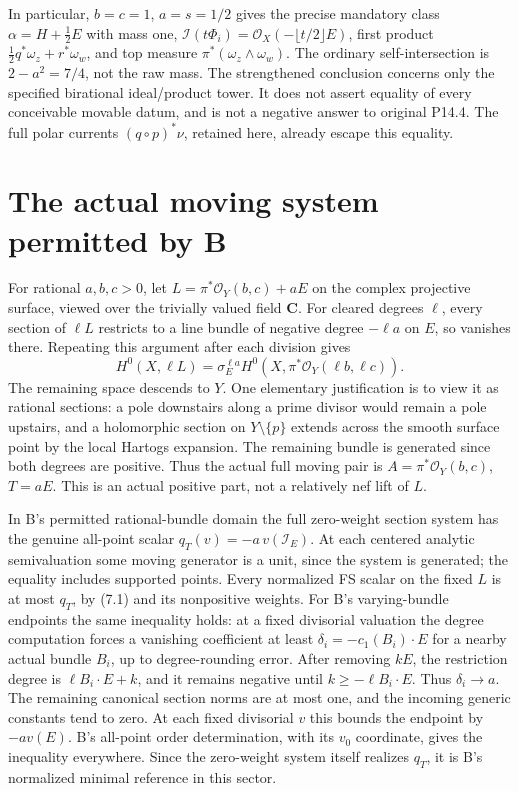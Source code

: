\documentclass[11pt]{article}
\theoremstyle{remark}\newtheorem{remark}[theorem]{Remark}
\newcommand{\cI}{\mathcal I}
\begin{document}
In particular, $b=c=1$, $a=s=1/2$ gives the precise mandatory
class $\alpha=H+\frac12E$ with mass one,
$\cI(t\Phi_i)=\mathcal O_X(-\lfloor t/2\rfloor E)$,
first product $\frac12q^*\omega_z+r^*\omega_w$, and top measure
$\pi^*(\omega_z\wedge\omega_w)$.
The ordinary self-intersection is $2-a^2=7/4$, not the raw mass.
The strengthened conclusion concerns only the specified birational
ideal/product tower. It does not assert equality of every conceivable
movable datum, and is not a negative answer to original P14.4.
The full polar currents $(q\circ p)^*\nu$, retained here,
already escape this equality.

\section{The actual moving system permitted by B}\label{Bboundary}
For rational $a,b,c>0$, let
$L=\pi^*\mathcal O_Y(b,c)+aE$ on the complex projective surface,
viewed over the trivially valued field $\mathbf C$.
For cleared degrees $\ell$, every section of $\ell L$ restricts
to a line bundle of negative degree $-\ell a$ on $E$, so vanishes
there. Repeating this argument after each division gives
\[
 H^0(X,\ell L)=\sigma_E^{\ell a}
      H^0(X,\pi^*\mathcal O_Y(\ell b,\ell c)).
 \tag{7.1}
\]
The remaining space descends to $Y$.
One elementary justification is to view it as rational sections:
a pole downstairs along a prime divisor would remain a pole
upstairs, and a holomorphic section on $Y\setminus\{p\}$ extends
across the smooth surface point by the local Hartogs expansion.
The remaining bundle is generated since both degrees are positive.
Thus the actual full moving pair is
$A=\pi^*\mathcal O_Y(b,c)$, $T=aE$.
This is an actual positive part, not a relatively nef lift of $L$.

In B's permitted rational-bundle domain the full zero-weight
section system has the genuine all-point scalar
$q_T(v)=-a\,v(\mathcal I_E)$.
At each centered analytic semivaluation some moving generator is
a unit, since the system is generated; the equality includes
supported points. Every normalized FS scalar on the fixed $L$
is at most $q_T$, by (7.1) and its nonpositive weights.
For B's varying-bundle endpoints the same inequality holds:
at a fixed divisorial valuation the degree computation forces
a vanishing coefficient at least
$\delta_i=-c_1(B_i)\cdot E$ for a nearby actual bundle $B_i$,
up to degree-rounding error. After removing $kE$, the restriction
degree is $\ell B_i\cdot E+k$, and it remains negative until
$k\geq-\ell B_i\cdot E$. Thus $\delta_i\to a$.
The remaining canonical section norms are at most one, and the
incoming generic constants tend to zero. At each fixed divisorial
$v$ this bounds the endpoint by $-a v(E)$.
B's all-point order determination, with its $v_0$ coordinate,
gives the inequality everywhere.
Since the zero-weight system itself realizes $q_T$,
it is B's normalized minimal reference in this sector.
\end{document}
